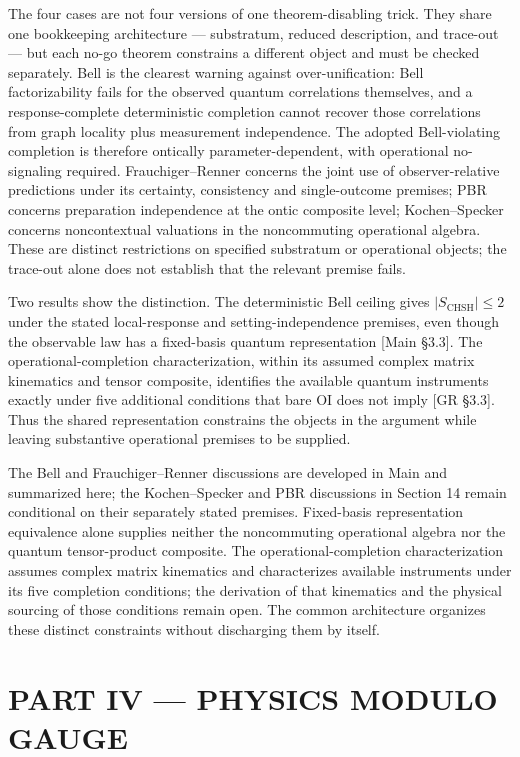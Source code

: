 \documentclass[
]{article}
\begin{document}
The four cases are not four versions of one theorem-disabling trick.
They share one bookkeeping architecture --- substratum, reduced
description, and trace-out --- but each no-go theorem constrains a
different object and must be checked separately. Bell is the clearest
warning against over-unification: Bell factorizability fails for the
observed quantum correlations themselves, and a response-complete
deterministic completion cannot recover those correlations from graph
locality plus measurement independence. The adopted Bell-violating
completion is therefore ontically parameter-dependent, with operational
no-signaling required. Frauchiger--Renner concerns the joint use of
observer-relative predictions under its certainty, consistency and
single-outcome premises; PBR concerns preparation independence at the
ontic composite level; Kochen--Specker concerns noncontextual valuations
in the noncommuting operational algebra. These are distinct restrictions
on specified substratum or operational objects; the trace-out alone does
not establish that the relevant premise fails.

Two results show the distinction. The deterministic Bell ceiling gives
\(|S_{\mathrm{CHSH}}|\le2\) under the stated local-response and
setting-independence premises, even though the observable law has a
fixed-basis quantum representation {[}Main §3.3{]}. The
operational-completion characterization, within its assumed complex
matrix kinematics and tensor composite, identifies the available quantum
instruments exactly under five additional conditions that bare OI does
not imply {[}GR §3.3{]}. Thus the shared representation constrains the
objects in the argument while leaving substantive operational premises
to be supplied.

The Bell and Frauchiger--Renner discussions are developed in Main and
summarized here; the Kochen--Specker and PBR discussions in Section 14
remain conditional on their separately stated premises. Fixed-basis
representation equivalence alone supplies neither the noncommuting
operational algebra nor the quantum tensor-product composite. The
operational-completion characterization assumes complex matrix
kinematics and characterizes available instruments under its five
completion conditions; the derivation of that kinematics and the
physical sourcing of those conditions remain open. The common
architecture organizes these distinct constraints without discharging
them by itself.

\hypertarget{part-iv-physics-modulo-gauge}{%
\section{PART IV --- PHYSICS MODULO
GAUGE}\label{part-iv-physics-modulo-gauge}}
\end{document}
